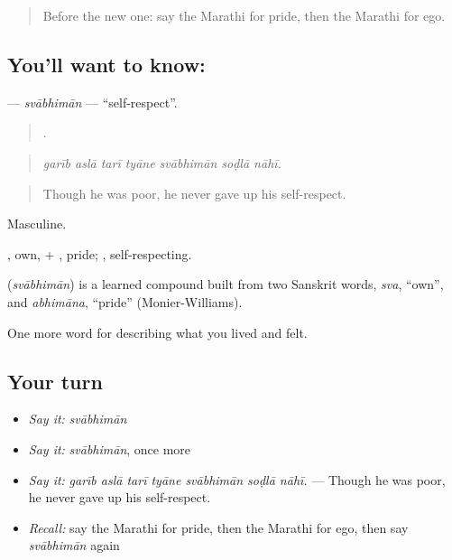 \label{lesson:MR-C463-svabhiman}



\begin{quote}
Before the new one: say the Marathi for pride, then the Marathi for ego.
\end{quote}

\subsection*{You'll want to know: }
\textbf{} — \emph{svābhimān} — \textquotedblleft{}self-respect\textquotedblright{}.

\begin{quote}
      .
\end{quote}

\begin{quote}
\emph{garīb aslā tarī tyāne svābhimān soḍlā nāhī.}
\end{quote}

\begin{quote}
Though he was poor, he never gave up his self-respect.
\end{quote}

Masculine.

, own, + , pride; , self-respecting.

\begin{cousinweb}
\textbf{} (\emph{svābhimān}) is a learned compound built from two Sanskrit words, \emph{sva}, \textquotedblleft{}own\textquotedblright{}, and \emph{abhimāna}, \textquotedblleft{}pride\textquotedblright{} (Monier-Williams).
\end{cousinweb}

\begin{grammarlens}[title={What you've built}]
One more word for describing what you lived and felt.
\end{grammarlens}

\subsection*{Your turn}
\begin{itemize}
\raggedright
  \item \emph{Say it:} \emph{svābhimān}
  \item \emph{Say it:} \emph{svābhimān}, once more
  \item \emph{Say it:} \emph{garīb aslā tarī tyāne svābhimān soḍlā nāhī.} — Though he was poor, he never gave up his self-respect.
  \item \emph{Recall:} say the Marathi for pride, then the Marathi for ego, then say \emph{svābhimān} again
\end{itemize}

